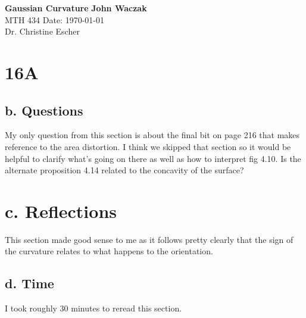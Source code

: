 \documentclass[a4paper, 11pt]{article}
\begin{document}
\noindent
\large\textbf{Gaussian Curvature} \hfill \textbf{John Waczak} \\
\normalsize MTH 434 \hfill  Date: \today \\
Dr. Christine Escher \\

\section*{16A}
	\subsection*{b. Questions}
	My only question from this section is about the final bit on page 216 that makes reference to the area distortion. I think we skipped that section so it would be helpful to clarify what's going on there as well as how to interpret fig 4.10.  Is the alternate proposition 4.14 related to the concavity of the surface? 
	
	\section*{c. Reflections}
	This section made good sense to me as it follows pretty clearly that the sign of the curvature relates to what happens to the orientation. 
	\subsection*{d. Time}
	I took roughly 30 minutes to reread this section. 
\end{document}

